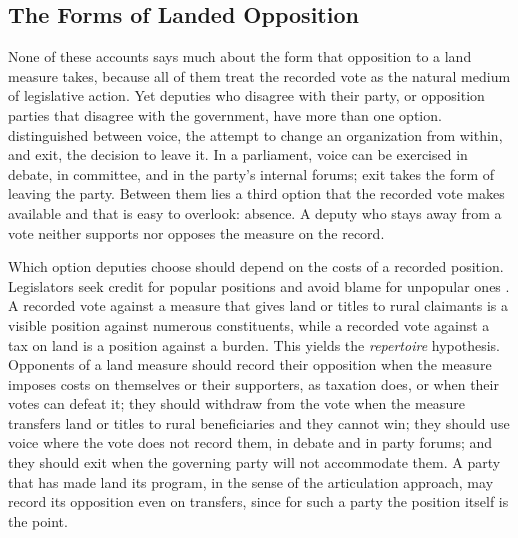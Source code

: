 \documentclass[12pt]{article}
\begin{document}
\subsection*{The Forms of Landed Opposition}

None of these accounts says much about the form that opposition to a land measure takes, because all of them treat the recorded vote as the natural medium of legislative action. Yet deputies who disagree with their party, or opposition parties that disagree with the government, have more than one option. \citet{hirschman1970} distinguished between voice, the attempt to change an organization from within, and exit, the decision to leave it. In a parliament, voice can be exercised in debate, in committee, and in the party's internal forums; exit takes the form of leaving the party. Between them lies a third option that the recorded vote makes available and that is easy to overlook: absence. A deputy who stays away from a vote neither supports nor opposes the measure on the record.

Which option deputies choose should depend on the costs of a recorded position. Legislators seek credit for popular positions and avoid blame for unpopular ones \citep{mayhew1974,weaver1986}. A recorded vote against a measure that gives land or titles to rural claimants is a visible position against numerous constituents, while a recorded vote against a tax on land is a position against a burden. This yields the \textit{repertoire} hypothesis. Opponents of a land measure should record their opposition when the measure imposes costs on themselves or their supporters, as taxation does, or when their votes can defeat it; they should withdraw from the vote when the measure transfers land or titles to rural beneficiaries and they cannot win; they should use voice where the vote does not record them, in debate and in party forums; and they should exit when the governing party will not accommodate them. A party that has made land its program, in the sense of the articulation approach, may record its opposition even on transfers, since for such a party the position itself is the point.
\end{document}
